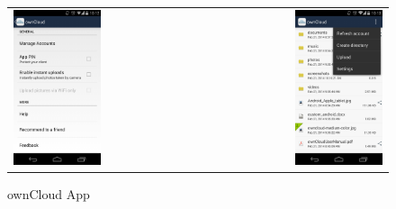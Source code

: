 \hspace{2 cm}

\begin{figure}[htb]
	\begin{tabular}{l r}
		\includegraphics[width=0.49\textwidth]{Bilder/ownCloud-mobile1}
		&
		\includegraphics[width=0.49\textwidth]{Bilder/ownCloud-mobile2}
	\end{tabular}
	\caption{ownCloud App}
	\label{Websitemobil}
\end{figure}

\cleardoublepage

